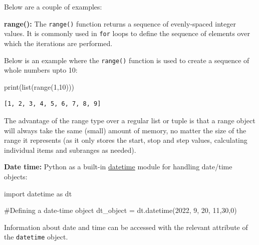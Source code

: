 \documentclass[
  letterpaper,
  DIV=11,
  numbers=noendperiod]{scrreprt}
\newenvironment{Shaded}{\begin{snugshade}}{\end{snugshade}}
\newcommand{\BuiltInTok}[1]{\textcolor[rgb]{0.00,0.23,0.31}{#1}}
\newcommand{\CommentTok}[1]{\textcolor[rgb]{0.37,0.37,0.37}{#1}}
\newcommand{\DecValTok}[1]{\textcolor[rgb]{0.68,0.00,0.00}{#1}}
\newcommand{\ImportTok}[1]{\textcolor[rgb]{0.00,0.46,0.62}{#1}}
\newcommand{\NormalTok}[1]{\textcolor[rgb]{0.00,0.23,0.31}{#1}}
\newcommand{\OperatorTok}[1]{\textcolor[rgb]{0.37,0.37,0.37}{#1}}
\begin{document}
Below are a couple of examples:

\textbf{range():} The \texttt{range()} function returns a sequence of
evenly-spaced integer values. It is commonly used in \texttt{for} loops
to define the sequence of elements over which the iterations are
performed.

Below is an example where the \texttt{range()} function is used to
create a sequence of whole numbers upto 10:

\begin{Shaded}
\begin{Highlighting}[]
\BuiltInTok{print}\NormalTok{(}\BuiltInTok{list}\NormalTok{(}\BuiltInTok{range}\NormalTok{(}\DecValTok{1}\NormalTok{,}\DecValTok{10}\NormalTok{)))}
\end{Highlighting}
\end{Shaded}

\begin{verbatim}
[1, 2, 3, 4, 5, 6, 7, 8, 9]
\end{verbatim}

The advantage of the range type over a regular list or tuple is that a
range object will always take the same (small) amount of memory, no
matter the size of the range it represents (as it only stores the start,
stop and step values, calculating individual items and subranges as
needed).

\textbf{Date time:} Python as a built-in
\href{https://docs.python.org/3/library/datetime.html}{datetime} module
for handling date/time objects:

\begin{Shaded}
\begin{Highlighting}[]
\ImportTok{import}\NormalTok{ datetime }\ImportTok{as}\NormalTok{ dt}
\end{Highlighting}
\end{Shaded}

\begin{Shaded}
\begin{Highlighting}[]
\CommentTok{\#Defining a date{-}time object }
\NormalTok{dt\_object }\OperatorTok{=}\NormalTok{ dt.datetime(}\DecValTok{2022}\NormalTok{, }\DecValTok{9}\NormalTok{, }\DecValTok{20}\NormalTok{, }\DecValTok{11}\NormalTok{,}\DecValTok{30}\NormalTok{,}\DecValTok{0}\NormalTok{)}
\end{Highlighting}
\end{Shaded}

Information about date and time can be accessed with the relevant
attribute of the \texttt{datetime} object.
\end{document}
